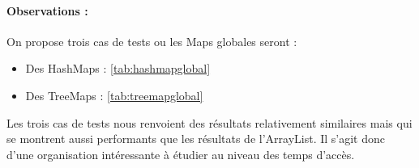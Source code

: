 \paragraph{Observations :}
On propose trois cas de tests ou les Maps globales seront :
\begin{itemize}
  \item Des HashMaps :  \ref{tab:hashmapglobal} 
  \item Des TreeMaps :  \ref{tab:treemapglobal} 
\end{itemize}
Les trois cas de tests nous renvoient des résultats relativement similaires mais qui se montrent aussi performants que les résultats de l'ArrayList. Il s'agit donc d'une organisation intéressante à étudier au niveau des temps d'accès.



